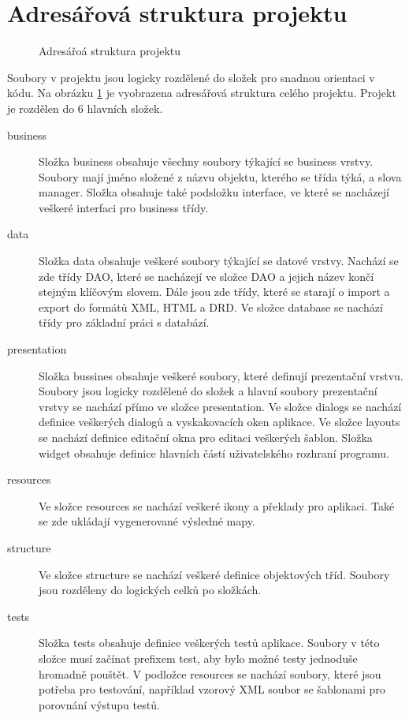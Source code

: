 \documentclass[thesis=B,czech]{resources/FITthesis}[2012/06/26]
\begin{document}
\section{Adresářová struktura projektu}
\begin{figure}
	\caption[Adresářová struktura projketu]{Adresářoá struktura projektu}
\label{fig:struktura}
\end{figure}
Soubory v projektu jsou logicky rozdělené do složek pro snadnou orientaci v kódu. Na obrázku \ref{fig:struktura} je vyobrazena adresářová struktura celého projektu.  Projekt je rozdělen do 6 hlavních složek.
\begin{description}
\item[business] Složka business obsahuje všechny soubory týkající se business vrstvy. Soubory mají jméno složené z názvu objektu, kterého se třída týká, a slova manager. Složka obsahuje také podsložku interface, ve které se nacházejí veškeré interfaci pro business třídy.
\item[data] Složka data obsahuje veškeré soubory týkající se datové vrstvy. Nachází se zde třídy DAO, které se nacházejí ve složce DAO a jejich název končí stejným klíčovým slovem. Dále jsou zde třídy, které se starají o import a export do formátů XML, HTML a DRD. Ve složce database se nachází třídy pro základní práci s databází.
\item[presentation]Složka bussines obsahuje veškeré soubory, které definují prezentační vrstvu. Soubory jsou logicky rozdělené do složek a hlavní soubory prezentační vrstvy se nachází přímo ve složce presentation. Ve složce dialogs se nachází definice veškerých dialogů a vyskakovacích oken aplikace. Ve složce layouts se nachází definice editační okna pro editaci veškerých šablon. Složka widget obsahuje definice hlavních částí uživatelského rozhraní programu.
\item[resources] Ve složce resources se nachází veškeré ikony a překlady pro aplikaci. Také se zde ukládají vygenerované výsledné mapy.
\item[structure] Ve složce structure se nachází veškeré definice objektových tříd. Soubory jsou rozděleny do logických celků po složkách.
\item[tests] Složka tests obsahuje definice veškerých testů aplikace. Soubory v této složce musí začínat prefixem test, aby bylo možné testy jednoduše hromadně pouštět. V podložce resources se nachází soubory, které jsou potřeba pro testování, například vzorový XML soubor se šablonami pro porovnání výstupu testů.
\end{description}
\end{document}
